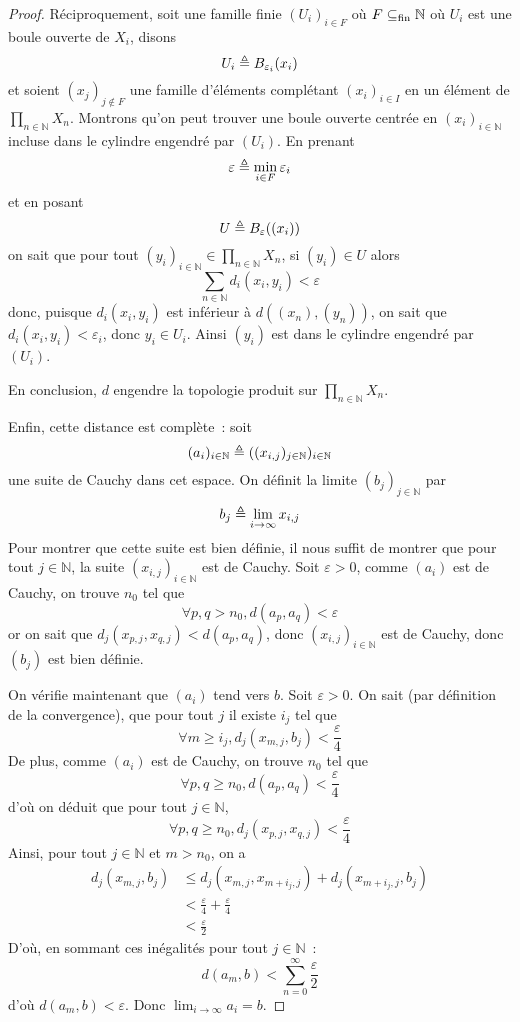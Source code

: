 \begin{proof}
  Réciproquement, soit une famille finie $(U_i)_{i \in F}$ où
  $F \subseteq_{\mathrm{fin}} \mathbb N$ où $U_i$ est une boule ouverte de $X_i$, disons
  \[U_i \triangleq B_{\varepsilon_i}(x_i)\]
  et soient $(x_j)_{j \notin F}$ une famille d'éléments complétant
  $(x_i)_{i \in I}$ en un élément de
  $\displaystyle\prod_{n \in \mathbb N} X_n$. Montrons qu'on peut trouver une boule
  ouverte centrée en $(x_i)_{i \in \mathbb N}$ incluse dans le cylindre engendré
  par $(U_i)$. En prenant
  \[\varepsilon \triangleq \min_{i \in F} \varepsilon_i\]
  et en posant
  \[U \triangleq B_\varepsilon ((x_i))\]
  on sait que pour tout
  $\displaystyle (y_i)_{i \in \mathbb N} \in \prod_{n \in \mathbb N} X_n$,
  si $(y_i) \in U$ alors
  \[\sum_{n \in \mathbb N} d_i(x_i,y_i) < \varepsilon\]
  donc, puisque $d_i(x_i,y_i)$ est inférieur à $d((x_n),(y_n))$, on sait que
  $d_i(x_i,y_i) < \varepsilon_i$, donc $y_i \in U_i$. Ainsi $(y_i)$ est dans
  le cylindre engendré par $(U_i)$.

  En conclusion, $d$ engendre la topologie produit sur
  $\displaystyle\prod_{n \in \mathbb N} X_n$.

  Enfin, cette distance est complète~: soit
  \[(a_i)_{i \in \mathbb N} \triangleq ((x_{i,j})_{j\in\mathbb N})_{i \in\mathbb N}\]
  une suite de Cauchy dans cet espace. On définit la limite
  $(b_j)_{j \in \mathbb N}$ par
  \[b_j \triangleq \lim_{i\to\infty} x_{i,j}\]
  Pour montrer que cette suite est bien définie, il nous suffit de montrer que
  pour tout $j\in\mathbb N$, la suite $(x_{i,j})_{i\in\mathbb N}$ est de Cauchy.
  Soit $\varepsilon > 0$, comme $(a_i)$ est de Cauchy, on trouve $n_0$ tel que
  \[\forall p,q > n_0, d(a_p,a_q) < \varepsilon\]
  or on sait que $d_j(x_{p,j},x_{q,j}) < d(a_p,a_q)$, donc
  $(x_{i,j})_{i \in \mathbb N}$ est de Cauchy, donc $(b_j)$ est bien définie.

  On vérifie maintenant que $(a_i)$ tend vers $b$. Soit $\varepsilon > 0$.
  On sait (par définition de la convergence), que pour tout $j$ il existe
  $i_j$ tel que
  \[\forall m \geq i_j, d_j(x_{m,j},b_j) < \frac{\varepsilon}{4}\]
  De plus, comme $(a_i)$ est de Cauchy, on trouve $n_0$ tel que
  \[\forall p,q \geq n_0, d(a_p,a_q) < \frac{\varepsilon}{4}\]
  d'où on déduit que pour tout $j \in \mathbb N$,
  \[\forall p,q \geq n_0, d_j(x_{p,j},x_{q,j}) < \frac{\varepsilon}{4}\]
  Ainsi, pour tout $j \in \mathbb N$ et $m > n_0$, on a
  \begin{align*}
    d_j(x_{m,j},b_j) &\leq d_j(x_{m,j},x_{m + i_j,j}) + d_j(x_{m + i_j,j}, b_j)\\
    &< \frac{\varepsilon}{4} + \frac{\varepsilon}{4}\\
    &< \frac{\varepsilon}{2}
  \end{align*}
  D'où, en sommant ces inégalités pour tout $j \in \mathbb N$~:
  \[d(a_m,b) < \sum_{n = 0}^\infty \frac{\varepsilon}{2}\]
  d'où $d(a_m,b) < \varepsilon$. Donc $\lim_{i \to \infty} a_i = b$.
  

\end{proof}
